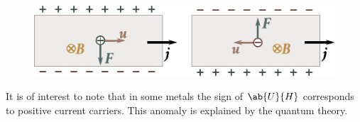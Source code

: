 \begin{figure}[!htb]
	\begin{center}
		\includegraphics[scale=1]{figures/ch_11/fig_11_4.pdf}
		\caption[]{}
		\label{fig:11_4}
	\end{center}
	\vspace{-0.8cm}
\end{figure}

It is of interest to note that in some metals the sign of $\ab{U}{H}$ corresponds to positive current carriers.
This anomaly is explained by the quantum theory.
